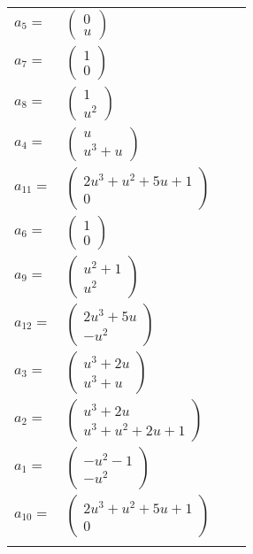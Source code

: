 \documentclass[1p]{elsarticle_modified}
\theoremstyle{definition}
\begin{document}
\begin{tabular}{m{7pt} m{180pt} m{7pt} m{180pt} }
\flushright $a_{5}=$&$\begin{pmatrix}0\\u\end{pmatrix}$ \\
\flushright $a_{7}=$&$\begin{pmatrix}1\\0\end{pmatrix}$ \\
\flushright $a_{8}=$&$\begin{pmatrix}1\\u^2\end{pmatrix}$ \\
\flushright $a_{4}=$&$\begin{pmatrix}u\\u^3+u\end{pmatrix}$ \\
\flushright $a_{11}=$&$\begin{pmatrix}2 u^3+u^2+5 u+1\\0\end{pmatrix}$ \\
\flushright $a_{6}=$&$\begin{pmatrix}1\\0\end{pmatrix}$ \\
\flushright $a_{9}=$&$\begin{pmatrix}u^2+1\\u^2\end{pmatrix}$ \\
\flushright $a_{12}=$&$\begin{pmatrix}2 u^3+5 u\\- u^2\end{pmatrix}$ \\
\flushright $a_{3}=$&$\begin{pmatrix}u^3+2 u\\u^3+u\end{pmatrix}$ \\
\flushright $a_{2}=$&$\begin{pmatrix}u^3+2 u\\u^3+u^2+2 u+1\end{pmatrix}$ \\
\flushright $a_{1}=$&$\begin{pmatrix}- u^2-1\\- u^2\end{pmatrix}$ \\
\flushright $a_{10}=$&$\begin{pmatrix}2 u^3+u^2+5 u+1\\0\end{pmatrix}$\\&\end{tabular}
\end{document}
